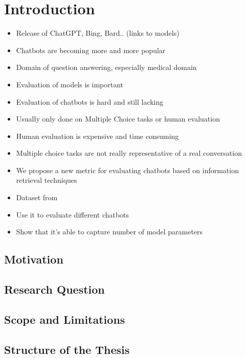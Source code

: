 \chapter{Introduction}\label{structure}
\begin{itemize}
  \item Release of ChatGPT, Bing, Bard.. (links to models)
  \item Chatbots are becoming more and more popular
  \item Domain of question answering, especially medical domain
  \item Evaluation of models is important
  \item Evaluation of chatbots is hard and still lacking
  \item Usually only done on Multiple Choice tasks or human evaluation \cite{singhal:2022}
  \item Human evaluation is expensive and time consuming
  \item Multiple choice tasks are not really representative of a real conversation
  \item We propose a new metric for evaluating chatbots based on information retrieval techniques
  \item Dataset from \cite{goeuriot:2021}
  \item Use it to evaluate different chatbots
  \item Show that it's able to capture number of model parameters
\end{itemize}


\enlargethispage{\baselineskip}

\section{Motivation}\label{sec:motivation}

\section{Research Question}\label{sec:research-question}

\section{Scope and Limitations}\label{sec:scope-and-limitations}

\section{Structure of the Thesis}\label{sec:structure-of-the-thesis}